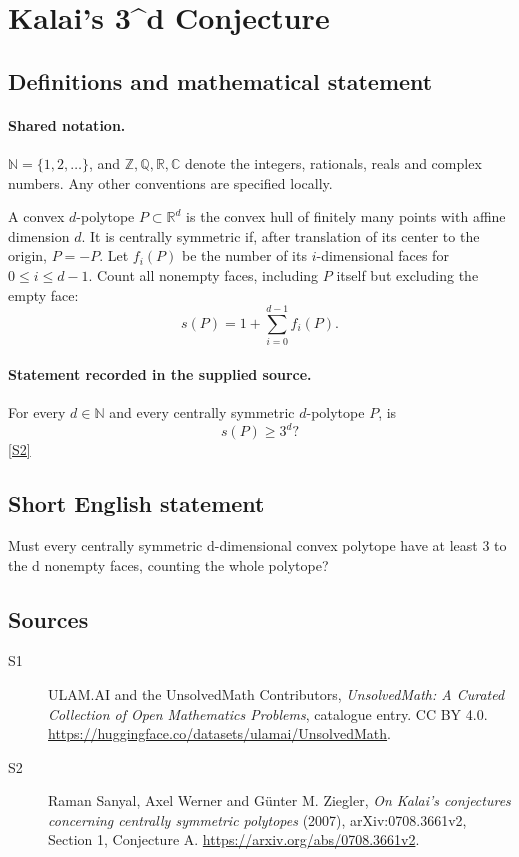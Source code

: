 \documentclass[11pt]{article}
\newcommand{\sref}[2]{\hyperlink{source:#1:#2}{[S#2]}}
\begin{document}
\section{Kalai's 3\textasciicircum{}d Conjecture}\label{statement}

\subsection{Definitions and mathematical statement}

\paragraph{Shared notation.}$\mathbb N=\{1,2,\ldots\}$, and $\mathbb Z,\mathbb Q,\mathbb R,\mathbb C$ denote the integers, rationals, reals and complex numbers. Any other conventions are specified locally.


A convex $d$-polytope $P\subset\mathbb R^d$ is the convex hull of finitely many points with affine dimension $d$. It is centrally symmetric if, after translation of its center to the origin, $P=-P$. Let $f_i(P)$ be the number of its $i$-dimensional faces for $0\le i\le d-1$. Count all nonempty faces, including $P$ itself but excluding the empty face:
\[
 s(P)=1+\sum_{i=0}^{d-1}f_i(P).
\]
\paragraph{Statement recorded in the supplied source.}
For every $d\in\mathbb N$ and every centrally symmetric $d$-polytope $P$, is
\[
 s(P)\ge3^d?
\]
\sref{statement}{2}
\subsection{Short English statement}
Must every centrally symmetric d-dimensional convex polytope have at least 3 to the d nonempty faces, counting the whole polytope?
\subsection{Sources}
\begin{description}
\item[\hypertarget{source:statement:1}{S1}] ULAM.AI and the UnsolvedMath Contributors, \emph{UnsolvedMath: A Curated Collection of Open Mathematics Problems}, catalogue entry. CC BY 4.0. \url{https://huggingface.co/datasets/ulamai/UnsolvedMath}.
\item[\hypertarget{source:statement:2}{S2}] Raman Sanyal, Axel Werner and Günter M. Ziegler, \emph{On Kalai's conjectures concerning centrally symmetric polytopes} (2007), arXiv:0708.3661v2, Section 1, Conjecture A. \url{https://arxiv.org/abs/0708.3661v2}.
\end{description}
\label{end:statement}
\end{document}

